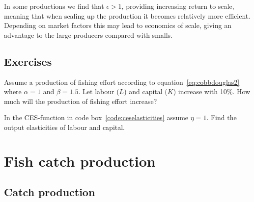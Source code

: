 \documentclass[11pt,fleqn]{book} %
\begin{document}
In some productions we find that $\epsilon > 1$, providing increasing return to scale, meaning that when scaling up the production it becomes relatively more efficient. Depending on market factors this may lead to economics of scale, giving an advantage to the large producers compared with smalls.

\section*{Exercises}

\begin{exercise}
Assume a production of fishing effort according to equation~\ref{eq:cobbdouglas2} where $\alpha = 1$ and $\beta = 1.5$. Let labour ($L$) and capital ($K$) increase with 10\%. How much will the production of fishing effort increase?
\end{exercise}

\begin{exercise}
In the CES-function in code box~\ref{code:ceselasticities} assume $\eta = 1$. Find the output elasticities of labour and capital.
\end{exercise}





\chapter{Fish catch production} \label{chapter 3}

\section{Catch production}
\end{document}

